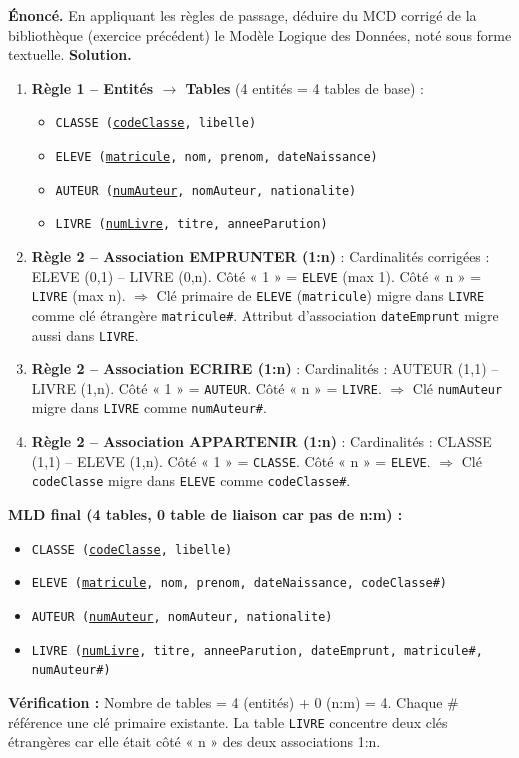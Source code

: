 \documentclass[11pt]{article}
\begin{document}
\begin{exoresolu}
\textbf{Énoncé.} En appliquant les règles de passage, déduire du MCD corrigé de la bibliothèque (exercice précédent) le Modèle Logique des Données, noté sous forme textuelle.
\tcblower
\textbf{Solution.}
\begin{enumerate}
\item \textbf{Règle 1 -- Entités $\to$ Tables} (4 entités = 4 tables de base) :
\begin{itemize}
\item \texttt{CLASSE (\underline{codeClasse}, libelle)}
\item \texttt{ELEVE (\underline{matricule}, nom, prenom, dateNaissance)}
\item \texttt{AUTEUR (\underline{numAuteur}, nomAuteur, nationalite)}
\item \texttt{LIVRE (\underline{numLivre}, titre, anneeParution)}
\end{itemize}
\item \textbf{Règle 2 -- Association EMPRUNTER (1:n)} : Cardinalités corrigées : ELEVE (0,1) -- LIVRE (0,n).
Côté « 1 » = \texttt{ELEVE} (max 1). Côté « n » = \texttt{LIVRE} (max n).
$\Rightarrow$ Clé primaire de \texttt{ELEVE} (\texttt{matricule}) migre dans \texttt{LIVRE} comme clé étrangère \texttt{matricule\#}.
Attribut d'association \texttt{dateEmprunt} migre aussi dans \texttt{LIVRE}.
\item \textbf{Règle 2 -- Association ECRIRE (1:n)} : Cardinalités : AUTEUR (1,1) -- LIVRE (1,n).
Côté « 1 » = \texttt{AUTEUR}. Côté « n » = \texttt{LIVRE}.
$\Rightarrow$ Clé \texttt{numAuteur} migre dans \texttt{LIVRE} comme \texttt{numAuteur\#}.
\item \textbf{Règle 2 -- Association APPARTENIR (1:n)} : Cardinalités : CLASSE (1,1) -- ELEVE (1,n).
Côté « 1 » = \texttt{CLASSE}. Côté « n » = \texttt{ELEVE}.
$\Rightarrow$ Clé \texttt{codeClasse} migre dans \texttt{ELEVE} comme \texttt{codeClasse\#}.
\end{enumerate}
\textbf{MLD final (4 tables, 0 table de liaison car pas de n:m) :}
\begin{itemize}
\item \texttt{CLASSE (\underline{codeClasse}, libelle)}
\item \texttt{ELEVE (\underline{matricule}, nom, prenom, dateNaissance, codeClasse\#)}
\item \texttt{AUTEUR (\underline{numAuteur}, nomAuteur, nationalite)}
\item \texttt{LIVRE (\underline{numLivre}, titre, anneeParution, dateEmprunt, matricule\#, numAuteur\#)}
\end{itemize}
\textbf{Vérification :} Nombre de tables = 4 (entités) + 0 (n:m) = 4. Chaque \# référence une clé primaire existante. La table \texttt{LIVRE} concentre deux clés étrangères car elle était côté « n » des deux associations 1:n.
\end{exoresolu}
\end{document}
